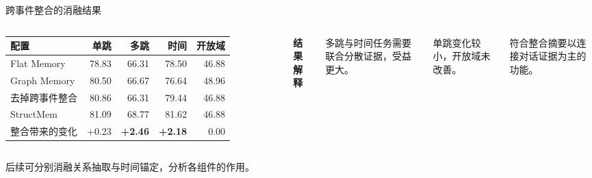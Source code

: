 \begin{frame}{跨事件整合的消融结果}
\small\renewcommand{\arraystretch}{1.3}
\begin{columns}[T,onlytextwidth]
\begin{tabularx}{\linewidth}{@{}Yrrrr@{}}
\toprule 配置 & 单跳 & 多跳 & 时间 & 开放域\\\midrule
Flat Memory & 78.83 & 66.31 & 78.50 & 46.88\\
Graph Memory & 80.50 & 66.67 & 76.64 & 48.96\\
去掉跨事件整合 & 80.86 & 66.31 & 79.44 & 46.88\\
StructMem & 81.09 & 68.77 & 81.62 & 46.88\\\midrule
整合带来的变化 & +0.23 & \textbf{+2.46} & \textbf{+2.18} & 0.00\\\bottomrule
\end{tabularx}\par
{}
\textbf{结果解释}\par\vspace{3mm}
多跳与时间任务需要联合分散证据，受益更大。\par\vspace{3mm}
单跳变化较小，开放域未改善。\par\vspace{3mm}
符合整合摘要以连接对话证据为主的功能。
\end{columns}
\par\vspace{3mm}后续可分别消融关系抽取与时间锚定，分析各组件的作用。\par
{}
\end{frame}

